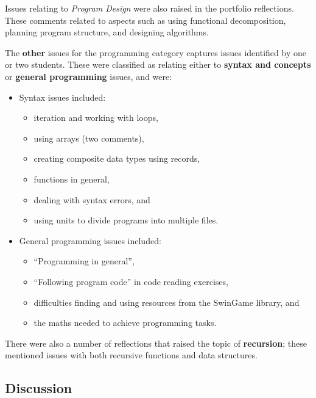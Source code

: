 Issues relating to \emph{Program Design} were also raised in the portfolio reflections. These comments related to aspects such as using functional decomposition, planning program structure, and designing algorithms.

The \textbf{other} issues for the programming category captures issues identified by one or two students. These were classified as relating either to \textbf{syntax and concepts} or \textbf{general programming} issues, and were:

\begin{itemize}[noitemsep,nolistsep]
  \item Syntax issues included:
  \begin{itemize}[noitemsep,nolistsep]
    \item iteration and working with loops,
    \item using arrays (two comments),
    \item creating composite data types using records,
    \item functions in general,
    \item dealing with syntax errors, and 
    \item using units to divide programs into multiple files.
  \end{itemize}
  \item General programming issues included:
  \begin{itemize}[noitemsep,nolistsep]
    \item ``Programming in general'',
    \item ``Following program code'' in code reading exercises,
    \item difficulties finding and using resources from the SwinGame library, and
    \item the maths needed to achieve programming tasks.
  \end{itemize}
\end{itemize}

There were also a number of reflections that raised the topic of \textbf{recursion}; these mentioned issues with both recursive functions and data structures. 


\subsection{Discussion} %
\label{sec:issues_discussion}

